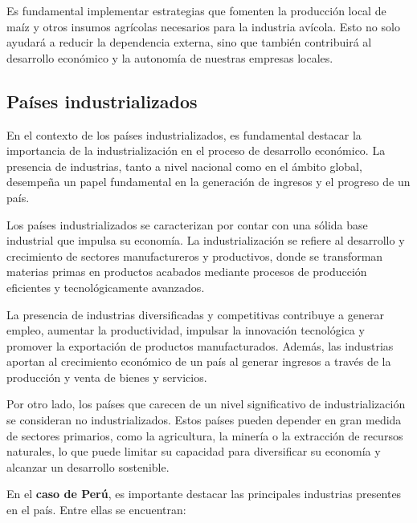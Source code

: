 \documentclass[
  jou,
  floatsintext,
  longtable,
  a4paper,
  nolmodern,
  notxfonts,
  notimes,
  12pt,
  colorlinks=true,linkcolor=blue,citecolor=blue,urlcolor=blue]{apa7}
\begin{document}
Es fundamental implementar estrategias que fomenten la producción local
de maíz y otros insumos agrícolas necesarios para la industria avícola.
Esto no solo ayudará a reducir la dependencia externa, sino que también
contribuirá al desarrollo económico y la autonomía de nuestras empresas
locales.

\subsection{Países industrializados}\label{pauxedses-industrializados}

En el contexto de los países industrializados, es fundamental destacar
la importancia de la industrialización en el proceso de desarrollo
económico. La presencia de industrias, tanto a nivel nacional como en el
ámbito global, desempeña un papel fundamental en la generación de
ingresos y el progreso de un país.

Los países industrializados se caracterizan por contar con una sólida
base industrial que impulsa su economía. La industrialización se refiere
al desarrollo y crecimiento de sectores manufactureros y productivos,
donde se transforman materias primas en productos acabados mediante
procesos de producción eficientes y tecnológicamente avanzados.

La presencia de industrias diversificadas y competitivas contribuye a
generar empleo, aumentar la productividad, impulsar la innovación
tecnológica y promover la exportación de productos manufacturados.
Además, las industrias aportan al crecimiento económico de un país al
generar ingresos a través de la producción y venta de bienes y
servicios.

Por otro lado, los países que carecen de un nivel significativo de
industrialización se consideran no industrializados. Estos países pueden
depender en gran medida de sectores primarios, como la agricultura, la
minería o la extracción de recursos naturales, lo que puede limitar su
capacidad para diversificar su economía y alcanzar un desarrollo
sostenible.

En el \textbf{caso de Perú}, es importante destacar las principales
industrias presentes en el país. Entre ellas se encuentran:
\end{document}
